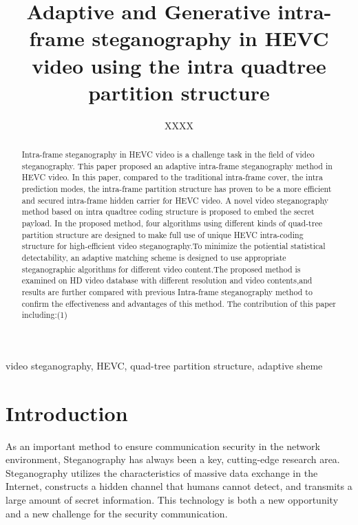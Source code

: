 \documentclass[journal,sort]{IEEEtran}
\begin{document}
\title{Adaptive and Generative intra-frame steganography in HEVC video using the intra quadtree partition structure}
\author{XXXX}
	

\maketitle

\begin{abstract}
Intra-frame steganography in HEVC video is a challenge task in the field of video steganography. This paper proposed an adaptive intra-frame steganography method in HEVC video. In this paper, compared to the traditional intra-frame cover, the intra prediction modes, the intra-frame partition structure has proven to be a more efficient and secured intra-frame hidden carrier for HEVC video. A novel video steganography method based on intra quadtree coding structure is proposed to embed the secret payload. In the proposed method, four algorithms using different kinds of quad-tree partition structure are designed to make full use of unique HEVC intra-coding structure for high-efficient video steganography.To minimize the potiential statistical detectability, an adaptive matching scheme is designed to use appropriate steganographic algorithms for different video content.The proposed method is examined on HD video database with different resolution and video contents,and results are further compared with previous Intra-frame steganography method to confirm the effectiveness and advantages of this method.
The contribution of  this paper including:(1)

	
	
\end{abstract}	
\begin{IEEEkeywords}
		video steganography, HEVC, quad-tree partition structure, adaptive sheme
\end{IEEEkeywords}
	
\section{Introduction\label{intro}}

As an important method to ensure communication security in the network environment, Steganography has always been a key, cutting-edge research area. Steganography utilizes the characteristics of massive data exchange in the Internet, constructs a hidden channel that humans cannot detect, and transmits a large amount of secret information. This technology is both a new opportunity and a new challenge for the security communication.
\end{document}
